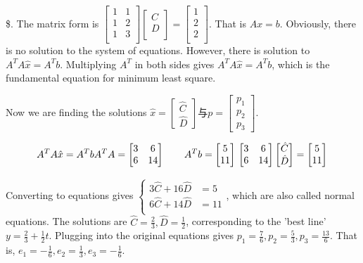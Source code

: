 \documentclass[11pt]{article}
\begin{document}
\$. The matrix form is
\(\begin{bmatrix}1&1 \\1&2 \\1&3\\\end{bmatrix}\begin{bmatrix}C\\D\\\end{bmatrix}=\begin{bmatrix}1\\2\\2\\\end{bmatrix}\).
That is \(Ax=b\). Obviously, there is no solution to the system of
equations. However, there is solution to \(A^TA\hat x=A^Tb\).
Multiplying \(A^T\) in both sides gives \(A^TA\hat x=A^Tb\), which is
the fundamental equation for minimum least square.

    Now we are finding the solutions
\(\hat x=\begin{bmatrix}\hat C\\ \hat D\end{bmatrix}\)与\(p=\begin{bmatrix}p_1\\p_2\\p_3\end{bmatrix}\).

\[
A^TA\hat x=A^Tb\\
A^TA=
\begin{bmatrix}3&6\\6&14\end{bmatrix}\qquad
A^Tb=
\begin{bmatrix}5\\11\end{bmatrix}\\
\begin{bmatrix}3&6\\6&14\end{bmatrix}
\begin{bmatrix}\hat C\\\hat D\end{bmatrix}=
\begin{bmatrix}5\\11\end{bmatrix}\\
\]

Converting to equations gives
\(\begin{cases}3\hat C+16\hat D&=5\\6\hat C+14\hat D&=11\\\end{cases}\),
which are also called normal equations. The solutions are
\(\hat C=\frac{2}{3}, \hat D=\frac{1}{2}\), corresponding to the 'best
line' \(y=\frac{2}{3}+\frac{1}{2}t\). Plugging into the original
equations gives \(p_1=\frac{7}{6}, p_2=\frac{5}{3}, p_3=\frac{13}{6}\).
That is, \(e_1=-\frac{1}{6}, e_2=\frac{1}{3}, e_3=-\frac{1}{6}\).
\end{document}
